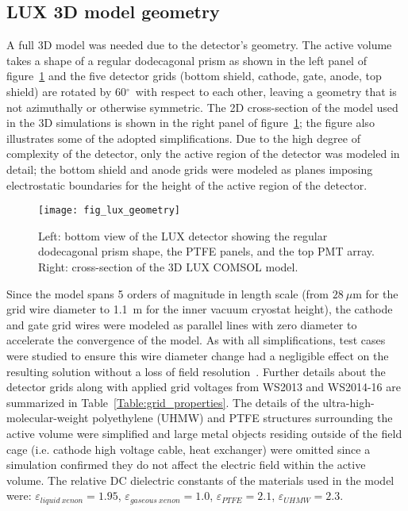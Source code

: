 \documentclass[11pt,a4paper]{article}
\begin{document}
\subsection{LUX 3D model geometry}
A full 3D model was needed due to the detector's geometry. The active volume takes a shape of a regular dodecagonal prism as shown in the left panel of figure~\ref{fig:lux_geometry} and the five detector grids (bottom shield, cathode, gate, anode, top shield) are rotated by 60$^{\circ}$~with respect to each other, leaving a geometry that is not azimuthally or otherwise symmetric. The 2D cross-section of the model used in the 3D simulations is shown in the right panel of figure~\ref{fig:lux_geometry}; the figure also illustrates some of the adopted simplifications. Due to the high degree of complexity of the detector, only the active region of the detector was modeled in detail; the bottom shield and anode grids were modeled as planes imposing electrostatic boundaries for the height of the active region of the detector.

\begin{figure}[ht!]
\begin{center}
\texttt{[image: fig\_lux\_geometry]}
\caption{Left: bottom view of the LUX detector showing the regular dodecagonal prism shape, the PTFE panels, and the top PMT array. Right: cross-section of the 3D LUX \textsc{COMSOL} model.}
\label{fig:lux_geometry}
\end{center} 
\end{figure}

Since the model spans 5 orders of magnitude in length scale (from $28~\mu$m for the grid wire diameter to 1.1~m for the inner vacuum cryostat height), the cathode and gate grid wires were modeled as parallel lines with zero diameter to accelerate the convergence of the model. As with all simplifications, test cases were studied to ensure this wire diameter change had a negligible effect on the resulting solution without a loss of field resolution~\cite{mcdonald2003notes}. Further details about the detector grids along with applied grid voltages from WS2013 and WS2014-16 are summarized in Table~\ref{Table:grid_properties}. The details of the ultra-high-molecular-weight polyethylene (UHMW) and PTFE structures surrounding the active volume were simplified and large metal objects residing outside of the field cage (i.e. cathode high voltage cable, heat exchanger) were omitted since a simulation confirmed they do not affect the electric field within the active volume. The relative DC dielectric constants of the materials used in the model were: $\varepsilon_{liquid~xenon}=1.95$, $\varepsilon_{gaseous~xenon}=1.0$, $\varepsilon_{PTFE}=2.1$, $\varepsilon_{UHMW}=2.3$.
\end{document}

